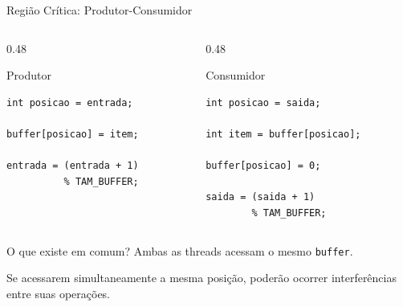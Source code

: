 \documentclass[aspectratio=169,11pt]{beamer}
\begin{document}
\begin{frame}[fragile]{Região Crítica: Produtor-Consumidor}

\begin{columns}[T]

\begin{column}{0.48\textwidth}

\begin{block}{Produtor}

\begin{verbatim}
int posicao = entrada;

buffer[posicao] = item;

entrada = (entrada + 1)
          % TAM_BUFFER;
\end{verbatim}

\end{block}

\end{column}

\begin{column}{0.48\textwidth}

\begin{block}{Consumidor}

\begin{verbatim}
int posicao = saida;

int item = buffer[posicao];

buffer[posicao] = 0;

saida = (saida + 1)
        % TAM_BUFFER;
\end{verbatim}

\end{block}

\end{column}

\end{columns}

\vspace{0.4cm}

\begin{alertblock}{O que existe em comum?}
Ambas as threads acessam o mesmo \texttt{buffer}.

Se acessarem simultaneamente a mesma posição, poderão
ocorrer interferências entre suas operações.
\end{alertblock}

\end{frame}


\end{document}
